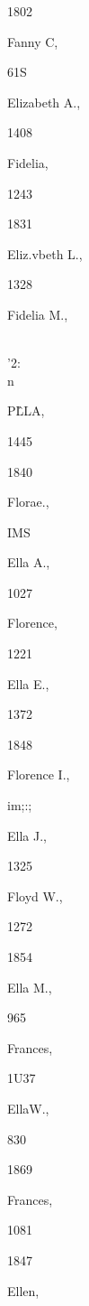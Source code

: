 \documentclass{book}
\begin{document}
1802 


Fanny C, 


61S 




Elizabeth A., 


1408 




Fidelia, 


1243 


1831 


Eliz.vbeth L., 


1328 




Fidelia M., 


\\'2:\\n 




P\^LLA, 


1445 


1840 


Florae., 


IMS 




Ella A., 


1027 




Florence, 


1221 




Ella E., 


1372 


1848 


Florence I., 


im;:; 




Ella J., 


1325 




Floyd W., 


1272 


1854 


Ella M., 


965 




Frances, 


1U37 




EllaW., 


830 


1869 


Frances, 


1081 


1847 


Ellen, 
\end{document}
